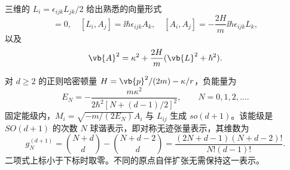 三维的 $L_i=\epsilon_{ijk}L_{jk}/2$ 给出熟悉的向量形式
\begin{equation}
 [A_i,H]=0,\quad [L_i,A_j]=\ii\hbar\epsilon_{ijk}A_k,
 \quad [A_i,A_j]=-\frac{2H}{m}\ii\hbar\epsilon_{ijk}L_k,
 \label{eq:phys-hdqm-runge-lenz-quantum-3d}
\end{equation}
以及
\begin{equation}
 \vb{A}^2=\kappa^2+\frac{2H}{m}(\vb{L}^2+\hbar^2).
 \label{eq:phys-hdqm-runge-lenz-casimir-3d}
\end{equation}

\begin{theorem}[固定 $1/r$ 势的束缚谱与隐对称性]
对 $d\ge2$ 的正则哈密顿量 $H=\vb{p}^2/(2m)-\kappa/r$，负能量为
\begin{equation}
 E_N=-\frac{m\kappa^2}{2\hbar^2[N+(d-1)/2]^2},\qquad N=0,1,2,\ldots .
 \label{eq:phys-hdqm-coulomb-energy-sod1}
\end{equation}
固定能级内，$M_i=\sqrt{-m/(2E_N)}A_i$ 与 $L_{ij}$ 生成 $so(d+1)$。该能级是 $SO(d+1)$ 的次数 $N$ 球谐表示，即对称无迹张量表示，其维数为
\begin{equation}
 g_N^{(d+1)}
 =\binom{N+d}{d}-\binom{N+d-2}{d}
 =\frac{(2N+d-1)(N+d-2)!}{N!(d-1)!}.
 \label{eq:phys-hdqm-sod1-dimension}
\end{equation}
二项式上标小于下标时取零。不同的原点自伴扩张无需保持这一表示。
\end{theorem}

